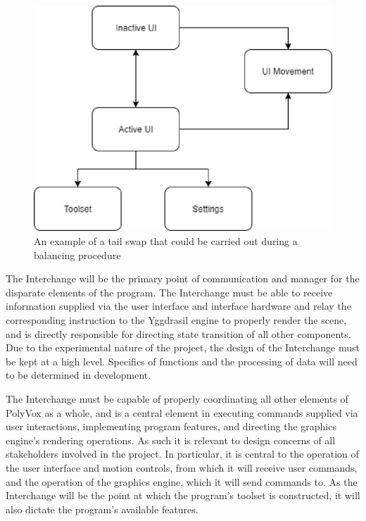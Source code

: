 \documentclass[onecolumn, draftclsnofoot,10pt, compsoc]{IEEEtran}
\newcounter{threesection}[subsubsection]
\begin{document}
\begin{figure}[H]
\begin{center}
\includegraphics[width=\textwidth]{UIDiagram.eps}
\caption{An example of a tail swap that could be carried out during a balancing procedure}
\end{center}
\end{figure}

The Interchange will be the primary point of communication and manager for the disparate elements of the program. The Interchange must be able to receive information supplied via the user interface and interface hardware and relay the corresponding instruction to the Yggdrasil engine to properly render the scene, and is directly responsible for directing state transition of all other components. Due to the experimental nature of the project, the design of the Interchange must be kept at a high level. Specifics of functions and the processing of data will need to be determined in development. 

The Interchange must be capable of properly coordinating all other elements of PolyVox as a whole, and is a central element  in executing commands supplied via user interactions, implementing program features, and directing the graphics engine’s rendering operations. As such it is relevant to design concerns of all stakeholders involved in the project. In particular, it is central to the operation of the user interface and motion controls, from which it will receive user commands, and the operation of the graphics engine, which it will send commands to. As the Interchange will be the point at which the program’s toolset is constructed, it will also dictate the program’s available features.
\end{document}
